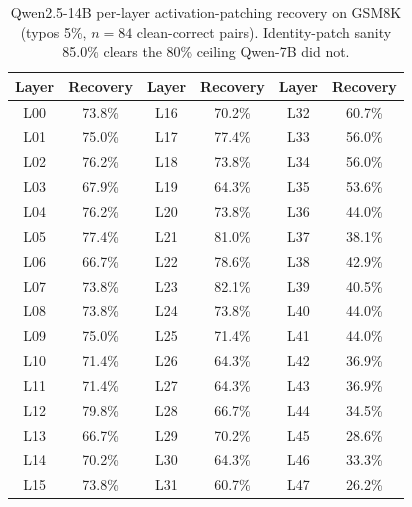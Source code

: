 \begin{table}[t]
\centering\small
\begin{tabular}{c c | c c | c c}
\toprule
Layer & Recovery & Layer & Recovery & Layer & Recovery \\
\midrule
L00 & 73.8\% & L16 & 70.2\% & L32 & 60.7\% \\
L01 & 75.0\% & L17 & 77.4\% & L33 & 56.0\% \\
L02 & 76.2\% & L18 & 73.8\% & L34 & 56.0\% \\
L03 & 67.9\% & L19 & 64.3\% & L35 & 53.6\% \\
L04 & 76.2\% & L20 & 73.8\% & L36 & 44.0\% \\
L05 & 77.4\% & L21 & 81.0\% & L37 & 38.1\% \\
L06 & 66.7\% & L22 & 78.6\% & L38 & 42.9\% \\
L07 & 73.8\% & L23 & 82.1\% & L39 & 40.5\% \\
L08 & 73.8\% & L24 & 73.8\% & L40 & 44.0\% \\
L09 & 75.0\% & L25 & 71.4\% & L41 & 44.0\% \\
L10 & 71.4\% & L26 & 64.3\% & L42 & 36.9\% \\
L11 & 71.4\% & L27 & 64.3\% & L43 & 36.9\% \\
L12 & 79.8\% & L28 & 66.7\% & L44 & 34.5\% \\
L13 & 66.7\% & L29 & 70.2\% & L45 & 28.6\% \\
L14 & 70.2\% & L30 & 64.3\% & L46 & 33.3\% \\
L15 & 73.8\% & L31 & 60.7\% & L47 & 26.2\% \\
\bottomrule
\end{tabular}
\caption{Qwen2.5-14B per-layer activation-patching recovery on GSM8K (typos 5\%, $n=84$ clean-correct pairs). Identity-patch sanity 85.0\% clears the 80\% ceiling Qwen-7B did not.}
\label{tab:qwen14b_patching_per_layer}
\end{table}
